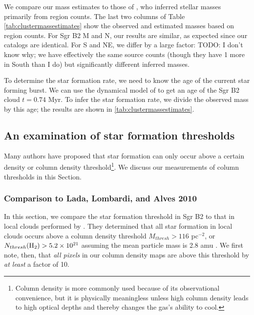 \documentclass[twocolumn]{aastex61}
\begin{document}
We compare our mass estimates to those of \citet{Schmiedeke2016a}, who inferred
stellar masses primarily from \hii region counts.  The last two columns of Table
\ref{tab:clustermassestimates} show the observed and estimated masses based on
\hii region counts.  For Sgr B2 M and N, our results are similar, as expected
since our catalogs are identical.  For S and NE, we differ by a large factor:
TODO: I don't know why; we have effectively the same source counts (though they
have 1 more in South than I do) but significantly different inferred masses.



To determine the star formation rate, we need to know the age of the current
star forming burst.  We can use the dynamical model of \citet{Kruijssen2015a}
to get an age of the Sgr B2 cloud $t=0.74$ Myr.  To infer the star formation
rate, we divide the observed mass by this age; the results are shown in
\ref{tab:clustermassestimates}.


% 

\subsection{An examination of star formation thresholds}
Many authors \citep[e.g.,][]{Lada2010a} have proposed that star formation can
only occur above a certain density or column density threshold\footnote{Column
density is more commonly used because of its observational convenience, but it
is physically meaningless unless high column density leads to high optical
depths and thereby changes the gas's ability to cool.}. 
We discuss our measurements of column thresholds in this Section.



\subsubsection{Comparison to Lada, Lombardi, and Alves 2010}
In this section, we compare the star formation threshold in Sgr B2 to that in
local clouds performed by \citet{Lada2010a}.  They determined that all star
formation in local clouds occurs above a column density threshold $M_{thresh} >
116$ \msun pc$^{-2}$, or $N_{thresh}(\textrm{H}_{2}) > 5.2\times10^{21}$ \persc assuming the
mean particle mass is 2.8 amu \citep{Kauffmann2008a}.  We first note, then,
that \emph{all pixels} in our column density maps are above this threshold
by \emph{at least} a factor of 10.
\end{document}
